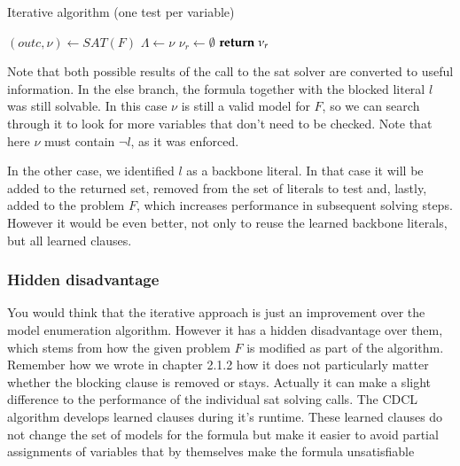 \begin{algorithm}
\caption{{\sc Iterative algorithm (one test per variable)}}
\DontPrintSemicolon
{}

$(outc,\nu) \gets SAT(F)$\;
$\Lambda \gets \nu$\;
$\nu_r \gets \emptyset$\;
$\Return \; \nu_r$\;
\end{algorithm}

Note that both possible results of the call to the sat solver are converted to useful information. In the else branch, the formula together with the blocked literal $l$ was still solvable. In this case $\nu$ is still a valid model for $F$, so we can search through it to look for more variables that don't need to be checked. Note that here $\nu$ must contain $\neg l$, as it was enforced.

In the other case, we identified $l$ as a backbone literal. In that case it will be added to the returned set, removed from the set of literals to test and, lastly, added to the problem $F$, which increases performance in subsequent solving steps. However it would be even better, not only to reuse the learned backbone literals, but all learned clauses.

\subsubsection{Hidden disadvantage}

You would think that the iterative approach is just an improvement over the model enumeration algorithm. However it has a hidden disadvantage over them, which stems from how the given problem $F$ is modified as part of the algorithm. Remember how we wrote in chapter 2.1.2 how it does not particularly matter whether the blocking clause is removed or stays. Actually it can make a slight difference to the performance of the individual sat solving calls. The CDCL algorithm develops learned clauses during it's runtime. These learned clauses do not change the set of models for the formula but make it easier to avoid partial assignments of variables that by themselves make the formula unsatisfiable 

